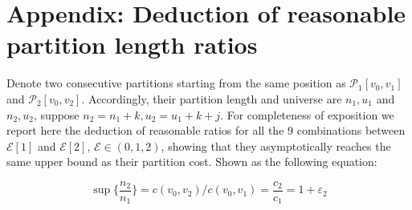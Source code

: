 \documentclass[runningheads,a4paper]{llncs}
\begin{document}



\section*{Appendix: Deduction of reasonable partition length ratios}\label{sec:appendix}

Denote two consecutive partitions starting from the same position as $ \mathcal{P}_{1}[ v_0, v_1 ] $ and $ \mathcal{P}_{2}[v_0, v_2] $. Accordingly, their partition length and universe are $ n_1, u_1 $ and $ n_2, u_2 $, suppose $n_2 = n_1 + k, u_2 = u_1 + k + j $.
For completeness of exposition we report here the deduction of reasonable ratios for all the 9 combinations between $ \mathcal{E}[1] $ and $ \mathcal{E}[2] $, $ \mathcal{E} \in (0,1,2) $, showing that they asymptotically reaches the same upper bound as their partition cost. Shown as the following equation:

\begin{equation}
	\sup\{\frac{n_2}{n_{1}}\} = {c\left(v_{0},v_{2}\right)}/{c\left(v_{0},v_{1}\right)}=\frac{c_2}{c_1}=1+\varepsilon_{2}
\end{equation}
\end{document}
